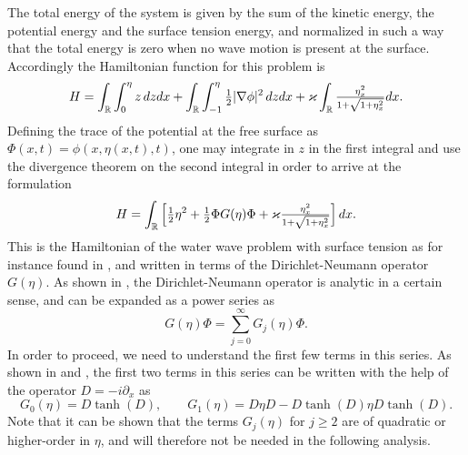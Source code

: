 The total energy of the system is given by the sum of the kinetic energy,
the potential energy and the surface tension energy,
and normalized in such a way that the total energy
is zero when no wave motion is present at the surface.
Accordingly the Hamiltonian function for this problem is
%
\[
	H = \int _{\mathbb R} \int_0^\eta z \, dz dx +
	\int _{\mathbb R} \int_{-1}^\eta {\textstyle{\frac{1}{2}}} |\nabla \phi|^2 \, dz dx
	+ \varkappa \int _{\mathbb R} {\textstyle{\frac{ \eta_x^2 }{ 1 + \sqrt{1 + \eta_x^2} }}} dx	
	.
\]
%
Defining the trace of the potential at the free surface as
$\Phi(x,t) = \phi(x,\eta(x,t),t)$,
one may integrate in $z$ in the first integral and use the divergence theorem 
on the second integral in order to arrive at the formulation
%
\begin{equation}
\label{Hamiltonian-eta-phi}
	H  = \int_{\mathbb{R}} \Big[ {\textstyle{\frac{1}{2}}} \eta^2 + {\textstyle{\frac{1}{2}}} \Phi G(\eta) \Phi
	+ \varkappa {\textstyle{\frac{ \eta_x^2 }{ 1 + \sqrt{1 + \eta_x^2} }}}	
	\Big] \, dx.
\end{equation}
%
This is the Hamiltonian of the water wave problem with surface tension
as for instance found in \cite{Alazard2011},
and written in terms of the Dirichlet-Neumann operator $G(\eta)$.
As shown in \cite{Nicholls}, the Dirichlet-Neumann operator is analytic
in a certain sense, and can be expanded as a power series as
%
\[
	G(\eta)\Phi = \sum_{j=0}^\infty G_j(\eta) \Phi
	.
\]
%
In order to proceed, we need to understand the first few terms in this series.
As shown in \cite{CS} and \cite{CG}, the first two terms in this series
can be written with the help of the operator $D = - i \partial_x$ as 
%
\[
	G_0(\eta)= D\tanh(D)
	, \qquad 
	G_1(\eta)= D\eta D - D\tanh(D) \eta D\tanh(D)
	. 
\]
%
%
Note that it can be shown that the terms $G_j(\eta)$ for $j\ge 2$ are of quadratic or
higher-order in $\eta$, and will therefore not be needed in the following
analysis.


